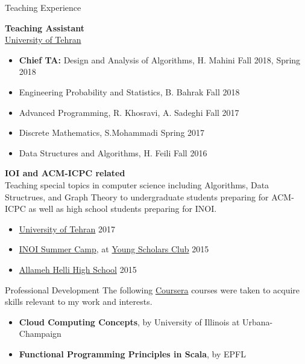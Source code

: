 \documentclass{resume} %
\begin{document}
\begin{rSection}{Teaching Experience}
	
	{\bf Teaching Assistant}
	\\\href{http://ut.ac.ir/en}{University of Tehran}
	\begin{itemize}
		\item {\bf Chief TA:} Design and Analysis of Algorithms, H. Mahini \hfill Fall 2018, Spring 2018
		\item Engineering Probability and Statistics, B. Bahrak \hfill Fall 2018
		\item Advanced Programming, R. Khosravi, A. Sadeghi \hfill Fall 2017
		\item Discrete Mathematics, S.Mohammadi \hfill Spring 2017
		\item Data Structures and Algorithms, H. Feili \hfill Fall 2016
	\end{itemize}
	
	{\bf IOI and ACM-ICPC related}
	\\Teaching special topics in computer science including Algorithms, Data Structrues,
	and Graph Theory to undergraduate students preparing for ACM-ICPC as well as high school
	students preparing for INOI.
	\begin{itemize}
		\item \href{http://ut.ac.ir/en}{University of Tehran} \hfill 2017
		\item \href{http://inoi.ir/}{INOI Summer Camp}, at \href{http://ysc.ac.ir/}{Young Scholars Club} \hfill 2015
		\item \href{http://www.helli.ir/}{Allameh Helli High School} \hfill 2015
	\end{itemize}
	
\end{rSection}


\begin{rSection}{Professional Development}
	The following \href{https://www.coursera.org/}{Coursera} courses were taken to acquire skills relevant to my work and interests.
	\begin{itemize}
		\item {\bf Cloud Computing Concepts}, by University of Illinois at Urbana-Champaign
		\item {\bf Functional Programming Principles in Scala}, by EPFL
	\end{itemize}
\end{rSection}
\end{document}
